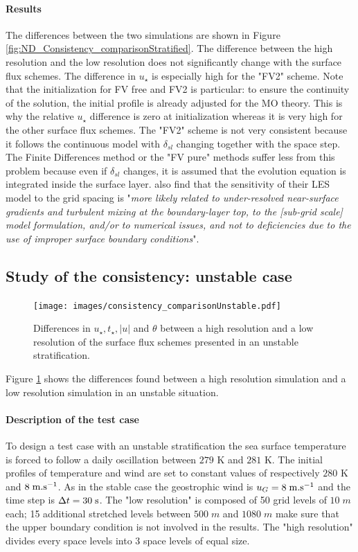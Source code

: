 \paragraph{Results} The differences between the two simulations are shown in Figure
\ref{fig:ND_Consistency_comparisonStratified}.
The difference between the high resolution and the low resolution
does not significantly change with the surface flux schemes.
The difference in $u_\star$ is especially high for the "FV2" scheme.
Note that the initialization for FV free and FV2 is particular:
to ensure the continuity of the solution,
the initial profile is already adjusted for the
MO theory. This is why the relative $u_\star$ difference is zero
at initialization whereas it is very high for the other surface flux
schemes.
%
The "FV2" scheme is not very consistent because it follows the
continuous model with $\delta_{sl}$ changing together with the
space step.
The Finite Differences method or the "FV pure" methods suffer
less from this problem because even if $\delta_{sl}$ changes,
it is assumed that the evolution equation is
integrated inside the surface layer.
\cite{maronga_improved_2020} also find that the
sensitivity of their LES model to the grid spacing is
"\textit{more
likely related to under-resolved near-surface gradients
and turbulent mixing at the boundary-layer top, to the
[sub-grid scale] model formulation, and/or to numerical issues,
and not to deficiencies due to the use of improper surface
boundary conditions}".
\subsection{Study of the consistency: unstable case}
\begin{figure}
	\centering
	\texttt{[image: images/consistency\_comparisonUnstable.pdf]}
	\caption{Differences in $u_\star, t_\star, |u|$ and $\theta$
	between a high resolution and a low resolution
	of the surface flux schemes presented in an unstable
	stratification.
	}
	\label{fig:ND_Consistency_comparisonUnstable}
\end{figure}
Figure \ref{fig:ND_Consistency_comparisonUnstable}
shows the differences found between a high resolution simulation
and a low resolution simulation in an unstable situation.
\paragraph{Description of the test case}
To design a test case with an unstable stratification
the sea surface temperature is forced to follow a daily oscillation
between $279$ K and $281$ K.
The initial profiles of temperature and wind
are set to constant values of respectively $280$ K and
$8 \; {\rm m}.{\rm s}^{-1}$.
As in the stable case the geostrophic wind is
$u_G = 8 \;{\rm m}.{\rm s}^{-1}$
and the time step is $\Delta t = 30 \;{\rm s}$.
The "low resolution" is composed of 50 grid levels of $10 \; m$
each; 15 additional stretched levels between $500 \; m$ and
$1080 \; m$ make sure that the upper boundary condition
is not involved in the results.
The "high resolution" divides every space levels into
3 space levels of equal size.
